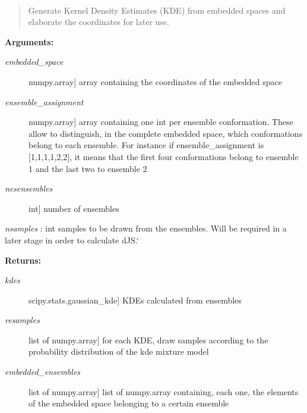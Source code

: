 \documentclass[letterpaper,10pt,english]{sphinxmanual}
\begin{document}

\begin{fulllineitems}
\label{index:encore.similarity.gen_kde_pdfs}~\begin{quote}

Generate Kernel Density Estimates (KDE) from embedded spaces and elaborate the coordinates for later use.
\end{quote}

\textbf{Arguments:}
\begin{description}
\item[{\emph{embedded\_space}}] \leavevmode{[}numpy.array{]}
array containing the coordinates of the embedded space

\item[{\emph{ensemble\_assignment}}] \leavevmode{[}numpy.array{]}
array containing one int per ensemble conformation. These allow to distinguish, in the complete embedded space, which conformations belong to each ensemble. For instance if ensemble\_assignment is {[}1,1,1,1,2,2{]}, it means that the first four conformations belong to ensemble 1 and the last two to ensemble 2

\item[{\emph{nesensembles}}] \leavevmode{[}int{]}
number of ensembles

\end{description}

\emph{nsamples} : int samples to be drawn from the ensembles. Will be required in a later stage in order to calculate dJS.{}`

\textbf{Returns:}
\begin{description}
\item[{\emph{kdes}}] \leavevmode{[}scipy.stats.gaussian\_kde{]}
KDEs calculated from ensembles

\item[{\emph{resamples}}] \leavevmode{[}list of numpy.array{]}
for each KDE, draw samples according to the probability distribution of the kde mixture model

\item[{\emph{embedded\_ensembles}}] \leavevmode{[}list of numpy.array{]}
list of numpy.array containing, each one, the elements of the embedded space belonging to a certain ensemble

\end{description}

\end{fulllineitems}
\end{document}
